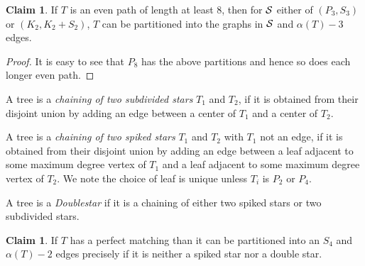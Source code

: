 \documentclass[12pt]{article}
\theoremstyle{definition}
\newtheorem{claim}[theorem]{Claim}
\begin{document}
\begin{claim}\label{P8}
If  $T$ is an even path of length at least $8$, then for  ${\cal S}$ either of   $(P_3,S_3)$ or $(K_2,K_2+S_2)$,
$T$ can be partitioned into the graphs in ${\cal S}$  and $\alpha(T)-3$ edges.
\end{claim}

\begin{proof}
It is easy to see that $P_8$ has the above partitions and hence so does each longer even path. 
\end{proof}

A tree is a {\it chaining of two subdivided  stars} $T_1$ and $T_2$,  if it is obtained from their disjoint union by adding an edge 
between a center of $T_1$ and a center of $T_2$.  

A tree is a {\it chaining of two spiked  stars}  $T_1$ and $T_2$ with $T_1$ not an edge,  if it is obtained from their disjoint union by adding an edge 
between a  leaf adjacent to some maximum degree vertex of $T_1$ and a leaf adjacent to some maximum degree vertex of $T_2$.
We note the choice of leaf is unique unless $T_i$ is $P_2$ or $P_4$. 

A tree is a {\it Doublestar} if it is a chaining of either two spiked stars or two subdivided stars. 

\begin{claim}\label{S4}
If $T$ has a perfect matching  than it can be partitioned into an $S_4$ and $\alpha(T)-2$ edges precisely if it is neither a spiked star nor a double star.  
\end{claim} 
\end{document}
